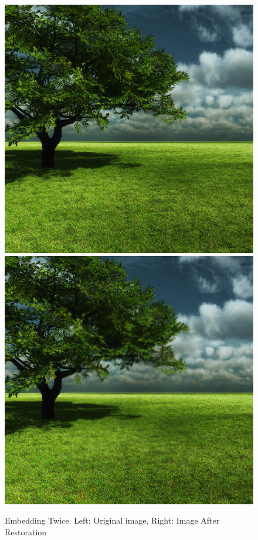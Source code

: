 \documentclass[12pt]{article}
\begin{document}
\begin{figure}[h]
\centerline{%
\includegraphics[scale=0.3375]{"tree"}%
\hspace{0.1cm}
\includegraphics[scale=0.45]{"Tree Embed twice 0.8 threshold/finalImageAfterRestoration"}%
}%
\caption{Embedding Twice. Left: Original image, Right: Image After Restoration}
\label{fig:treeEmbedTwiceRestore}
\end{figure}
\end{document}
